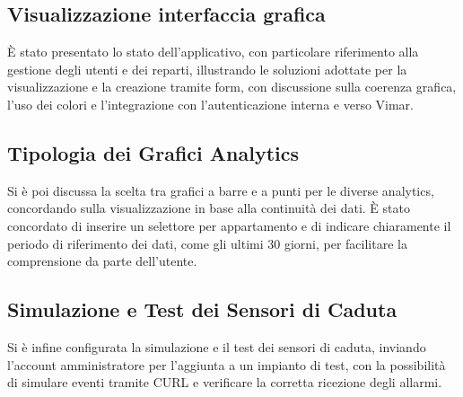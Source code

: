 \documentclass[10pt, letterpaper]{article}
\begin{document}
\subsection*{Visualizzazione interfaccia grafica}
È stato presentato lo stato dell'applicativo, con particolare riferimento alla gestione degli utenti e dei reparti, illustrando le soluzioni adottate per la visualizzazione e la creazione tramite form,
con discussione sulla coerenza grafica, l'uso dei colori e l'integrazione con l'autenticazione interna e verso Vimar.

\subsection*{Tipologia dei Grafici Analytics}
Si è poi discussa la scelta tra grafici a barre e a punti per le diverse analytics, concordando sulla visualizzazione in base alla continuità dei dati.
È stato concordato di inserire un selettore per appartamento e di indicare chiaramente il periodo di riferimento dei dati, come gli ultimi 30 giorni, per facilitare la comprensione da parte dell'utente.

\subsection*{Simulazione e Test dei Sensori di Caduta}
Si è infine configurata la simulazione e il test dei sensori di caduta, inviando l'account amministratore per l'aggiunta a un impianto di test, con la possibilità di simulare eventi tramite CURL e verificare la corretta ricezione degli allarmi.

\makeDecisionTable


\makeTodoTable
\end{document}
